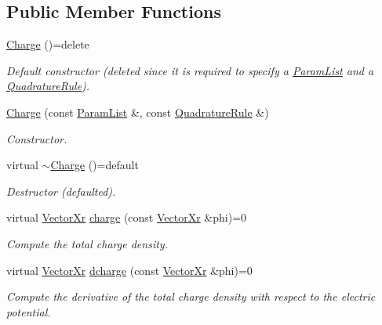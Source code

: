 \subsection*{Public Member Functions}
\begin{DoxyCompactItemize}
\item 
\hypertarget{classCharge_ad8bd7ca1f5eb4af83b0457a01aeeb001}{\hyperlink{classCharge_ad8bd7ca1f5eb4af83b0457a01aeeb001}{Charge} ()=delete}\label{classCharge_ad8bd7ca1f5eb4af83b0457a01aeeb001}

\begin{DoxyCompactList}\small\item\em Default constructor (deleted since it is required to specify a \hyperlink{classParamList}{Param\-List} and a \hyperlink{classQuadratureRule}{Quadrature\-Rule}). \end{DoxyCompactList}\item 
\hyperlink{classCharge_a447211f3a5181d4efb8f2c7f1012c32b}{Charge} (const \hyperlink{classParamList}{Param\-List} \&, const \hyperlink{classQuadratureRule}{Quadrature\-Rule} \&)
\begin{DoxyCompactList}\small\item\em Constructor. \end{DoxyCompactList}\item 
\hypertarget{classCharge_ad350b0cd3356862aacbf538e6cffac61}{virtual \hyperlink{classCharge_ad350b0cd3356862aacbf538e6cffac61}{$\sim$\-Charge} ()=default}\label{classCharge_ad350b0cd3356862aacbf538e6cffac61}

\begin{DoxyCompactList}\small\item\em Destructor (defaulted). \end{DoxyCompactList}\item 
virtual \hyperlink{typedefs_8h_aae6cee78ed9cd8f234ed8cb48682548a}{Vector\-Xr} \hyperlink{classCharge_a597abd6d429e1c18935e4806082d67d8}{charge} (const \hyperlink{typedefs_8h_aae6cee78ed9cd8f234ed8cb48682548a}{Vector\-Xr} \&phi)=0
\begin{DoxyCompactList}\small\item\em Compute the total charge density. \end{DoxyCompactList}\item 
virtual \hyperlink{typedefs_8h_aae6cee78ed9cd8f234ed8cb48682548a}{Vector\-Xr} \hyperlink{classCharge_acd71b3197f9081512d70d96ac694a3fc}{dcharge} (const \hyperlink{typedefs_8h_aae6cee78ed9cd8f234ed8cb48682548a}{Vector\-Xr} \&phi)=0
\begin{DoxyCompactList}\small\item\em Compute the derivative of the total charge density with respect to the electric potential. \end{DoxyCompactList}\end{DoxyCompactItemize}
